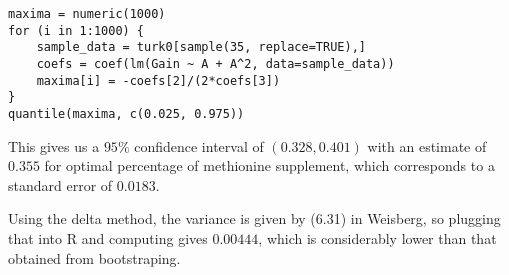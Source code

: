 \documentclass{article}
\begin{document}
\begin{verbatim}
maxima = numeric(1000)
for (i in 1:1000) {
    sample_data = turk0[sample(35, replace=TRUE),]
    coefs = coef(lm(Gain ~ A + A^2, data=sample_data))
    maxima[i] = -coefs[2]/(2*coefs[3])
}
quantile(maxima, c(0.025, 0.975))
\end{verbatim}

This gives us a $95\%$ confidence interval of $(0.328, 0.401)$ with an estimate of $0.355$ for optimal percentage of methionine supplement, which corresponds to a standard error of $0.0183$. 

Using the delta method, the variance is given by (6.31) in Weisberg, so plugging that into R and computing gives $0.00444$, which is considerably lower than that obtained from bootstraping.
\end{document}
